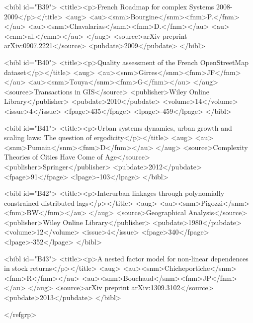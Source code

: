 \documentclass{article}
\begin{document}
{<bibl id="B39">
  <title><p>{French Roadmap for complex Systems 2008-2009}</p></title>
  <aug>
    <au><snm>{Bourgine}</snm><fnm>P.</fnm></au>
    <au><snm>{Chavalarias}</snm><fnm>D.</fnm></au>
    <au><cnm>al.</cnm></au>
  </aug>
  <source>arXiv preprint arXiv:0907.2221</source>
  <pubdate>2009</pubdate>
</bibl>

<bibl id="B40">
  <title><p>Quality assessment of the French OpenStreetMap dataset</p></title>
  <aug>
    <au><snm>Girres</snm><fnm>JF</fnm></au>
    <au><snm>Touya</snm><fnm>G</fnm></au>
  </aug>
  <source>Transactions in GIS</source>
  <publisher>Wiley Online Library</publisher>
  <pubdate>2010</pubdate>
  <volume>14</volume>
  <issue>4</issue>
  <fpage>435</fpage>
  <lpage>-459</lpage>
</bibl>

<bibl id="B41">
  <title><p>Urban systems dynamics, urban growth and scaling laws: The question
  of ergodicity</p></title>
  <aug>
    <au><snm>Pumain</snm><fnm>D</fnm></au>
  </aug>
  <source>Complexity Theories of Cities Have Come of Age</source>
  <publisher>Springer</publisher>
  <pubdate>2012</pubdate>
  <fpage>91</fpage>
  <lpage>-103</lpage>
</bibl>

<bibl id="B42">
  <title><p>Interurban linkages through polynomially constrained distributed
  lags</p></title>
  <aug>
    <au><snm>Pigozzi</snm><fnm>BW</fnm></au>
  </aug>
  <source>Geographical Analysis</source>
  <publisher>Wiley Online Library</publisher>
  <pubdate>1980</pubdate>
  <volume>12</volume>
  <issue>4</issue>
  <fpage>340</fpage>
  <lpage>-352</lpage>
</bibl>

<bibl id="B43">
  <title><p>A nested factor model for non-linear dependences in stock
  returns</p></title>
  <aug>
    <au><snm>Chicheportiche</snm><fnm>R</fnm></au>
    <au><snm>Bouchaud</snm><fnm>JP</fnm></au>
  </aug>
  <source>arXiv preprint arXiv:1309.3102</source>
  <pubdate>2013</pubdate>
</bibl>

</refgrp>
} %
\end{document}
